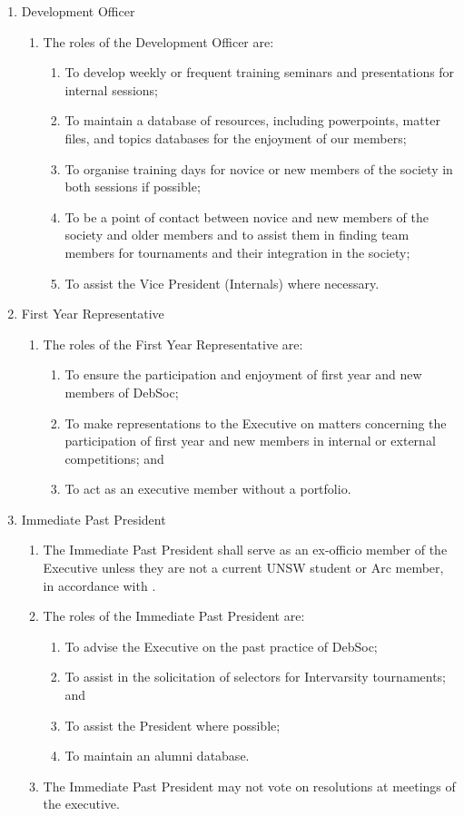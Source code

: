 \begin{enumerate}
\item Development Officer
  \begin{enumerate}
  \item The roles of the Development Officer are:
    \begin{enumerate}
    \item To develop weekly or frequent training seminars and presentations for internal sessions;
    \item To maintain a database of resources, including powerpoints, matter files, and topics databases for the enjoyment of our members;
    \item To organise training days for novice or new members of the society in both sessions if possible;
    \item To be a point of contact between novice and new members of the society and older members and to assist them in finding team members for tournaments and their integration in the society;
    \item To assist the Vice President (Internals) where necessary.
    \end{enumerate}
  \end{enumerate}

\item First Year Representative
  \begin{enumerate}
  \item The roles of the First Year Representative are:
    \begin{enumerate}
    \item To ensure the participation and enjoyment of first year and new members of DebSoc;
    \item To make representations to the Executive on matters concerning the participation of first year and new members in internal or external competitions; and
    \item To act as an executive member without a portfolio.
    \end{enumerate}
  \end{enumerate}

\item Immediate Past President
  \begin{enumerate}
  \item The Immediate Past President shall serve as an ex-officio member of the Executive unless they are not a current UNSW student or Arc member, in accordance with .
  \item The roles of the Immediate Past President are:
    \begin{enumerate}
    \item To advise the Executive on the past practice of DebSoc;
    \item To assist in the solicitation of selectors for Intervarsity tournaments; and
    \item To assist the President where possible;
    \item To maintain an alumni database.
    \end{enumerate}
  \item The Immediate Past President may not vote on resolutions at meetings of the executive.
  \end{enumerate}


\end{enumerate}
